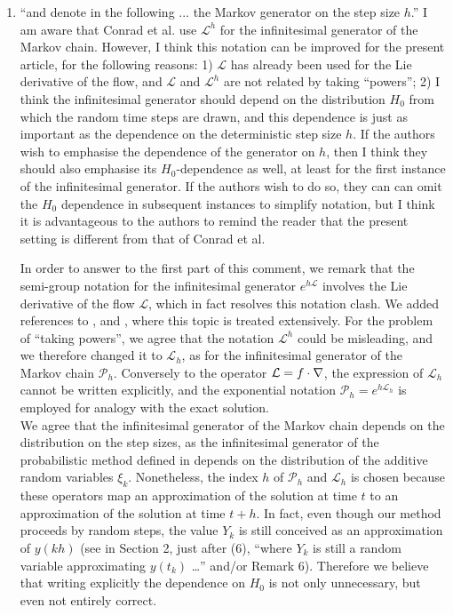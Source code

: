 \documentclass[10pt]{article}
\begin{document}
\begin{enumerate}
	\item 
	\begin{itquote} 
		{}``and denote in the following ... the Markov generator on the step size $h$.'' I am aware that Conrad et al. use $\mathcal{L}^h$ for the infinitesimal generator of the Markov chain. However, I think this notation can be improved for the present article, for the following reasons: 1) $\mathcal{L}$ has already been used for the Lie derivative of the flow, and $\mathcal{L}$ and $\mathcal{L}^h$ are not related by taking ``powers''; 2) I think the infinitesimal generator should depend on the distribution $H_0$ from which the random time steps are drawn, and this dependence is just as important as the dependence on the deterministic step size $h$. If the authors wish to emphasise the dependence of the generator on $h$, then I think they should also emphasise its $H_0$-dependence as well, at least for the first instance of the infinitesimal generator. If the authors wish to do so, they can can omit the $H_0$ dependence in subsequent instances to simplify notation, but I think it is advantageous to the authors to remind the reader that the present setting is different from that of Conrad et al.
	\end{itquote}
	In order to answer to the first part of this comment, we remark that the semi-group notation for the infinitesimal generator $e^{h\mathcal L}$ involves the Lie derivative of the flow $\mathcal L$, which in fact resolves this notation clash. We added references to \cite[Section 4.3]{PaS08}, \cite[Section III.5.1]{HLW06} and \cite[Section 2.3]{Pav14}, where this topic is treated extensively. For the problem of ``taking powers'', we agree that the notation $\mathcal L^h$ could be misleading, and we therefore changed it to $\mathcal L_h$, as for the infinitesimal generator of the Markov chain $\mathcal P_h$. Conversely to the operator $\mathcal{L} = f \cdot \nabla$, the expression of $\mathcal L_h$ cannot be written explicitly, and the exponential notation $\mathcal P_h = e^{h\mathcal L_h}$ is employed for analogy with the exact solution. \\
	We agree that the infinitesimal generator of the Markov chain depends on the distribution on the step sizes, as the infinitesimal generator of the probabilistic method defined in \cite{CGS17} depends on the distribution of the additive random variables $\xi_k$. Nonetheless, the index $h$ of $\mathcal P_h$ and $\mathcal L_h$ is chosen because these operators map an approximation of the solution at time $t$ to an approximation of the solution at time $t+h$. In fact, even though our method proceeds by random steps, the value $Y_k$ is still conceived as an approximation of $y(kh)$ (see in Section 2, just after (6), ``where $Y_k$ is still a random variable approximating $y(t_k)$ \ldots'' and/or Remark 6). Therefore we believe that writing explicitly the dependence on $H_0$ is not only unnecessary, but even not entirely correct.

\end{enumerate}
\end{document}
